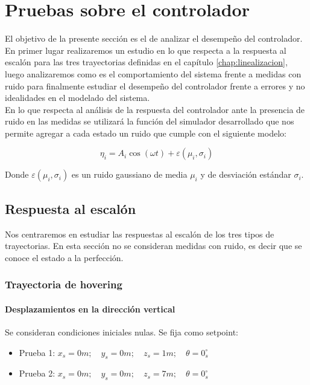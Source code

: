 \documentclass[main]{subfiles}
\begin{document}
\chapter{Pruebas sobre el controlador}
\label{chap:test_control}

El objetivo de la presente secci\'on es el de analizar el desempeño del controlador. En primer lugar realizaremos un estudio en lo que respecta a la respuesta al escal\'on para las tres trayectorias definidas en el cap\'itulo \ref{chap:linealizacion}, luego analizaremos como es el comportamiento del sistema frente a medidas con ruido para finalmente estudiar el desempeño del controlador frente a errores y no idealidades en el modelado del sistema.\\

En lo que respecta al an\'alisis de la respuesta del controlador ante la presencia de ruido en las medidas se utilizar\'a la funci\'on del simulador desarrollado que nos permite agregar a cada estado un ruido que cumple con el siguiente modelo:

\begin{equation}
\label{eq:noise}
\eta_i = A_i\cos(\omega t)+\varepsilon(\mu_i,\sigma_i)
\end{equation}

Donde $\varepsilon(\mu_i,\sigma_i)$ es un ruido gaussiano de media $\mu_i$ y de desviaci\'on est\'andar $\sigma_i$.

\section{Respuesta al escal\'on}
Nos centraremos en estudiar las respuestas al escal\'on de los tres tipos de trayectorias. En esta secci\'on no se consideran medidas con ruido, es decir que se conoce el estado a la perfecci\'on.  

\subsection{Trayectoria de hovering}

\subsubsection{Desplazamientos en la direcci\'on vertical}
Se consideran condiciones iniciales nulas. Se fija como setpoint:
\begin{itemize}
\item Prueba 1: ${x_s = 0 m;\quad y_s = 0 m;\quad z_s = 1 m;\quad \theta = 0_s^\circ}$
\item Prueba 2: ${x_s = 0 m;\quad y_s = 0 m;\quad z_s = 7 m;\quad \theta = 0_s^\circ}$
\end{itemize}
\end{document}
